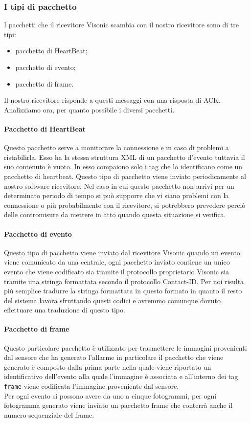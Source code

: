 \subsubsection{I tipi di pacchetto}
I pacchetti che il ricevitore Visonic scambia con il nostro ricevitore sono di tre tipi:
\begin{itemize}
	\item pacchetto di HeartBeat;
	\item pacchetto di evento;
	\item pacchetto di frame.
\end{itemize}
Il nostro ricevitore risponde a questi messaggi con una risposta di ACK. Analizziamo ora, per quanto possibile i diversi pacchetti.
\paragraph{Pacchetto di HeartBeat}
Questo pacchetto serve a monitorare la connessione e in caso di problemi a ristabilirla. Esso ha la stessa struttura XML di un pacchetto d'evento tuttavia il suo contenuto è vuoto. In esso compaiono solo i tag che lo identificano come un pacchetto di heartbeat. Questo tipo di pacchetto viene inviato periodicamente al nostro software ricevitore. Nel caso in cui questo pacchetto non arrivi per un determinato periodo di tempo si può supporre che vi siano problemi con la connessione o più probabilmente con il ricevitore, si potrebbero prevedere perciò delle contromisure da mettere in atto quando questa situazione si verifica.
\paragraph{Pacchetto di evento}
Questo tipo di pacchetto viene inviato dal ricevitore Visonic quando un evento viene comunicato da una centrale, ogni pacchetto inviato contiene un unico evento che viene codificato sia tramite il protocollo proprietario Visonic sia tramite una stringa formattata secondo il protocollo Contact-ID.
Per noi risulta più semplice tradurre la stringa formattata in questo formato in quanto il resto del sistema lavora sfruttando questi codici e avremmo comunque dovuto effettuare una traduzione di questo tipo.
\paragraph{Pacchetto di frame}
Questo particolare pacchetto è utilizzato per trasmettere le immagini provenienti dal sensore che ha generato l'allarme in particolare il pacchetto che viene generato è composto dalla prima parte nella quale viene riportato un identificativo dell'evento alla quale l'immagine è associata e all'interno dei tag \texttt{frame} viene codificata l'immagine proveniente dal sensore.\\
Per ogni evento si possono avere da uno a cinque fotogrammi, per ogni fotogramma generato viene inviato un pacchetto frame che conterrà anche il numero sequenziale del frame.
